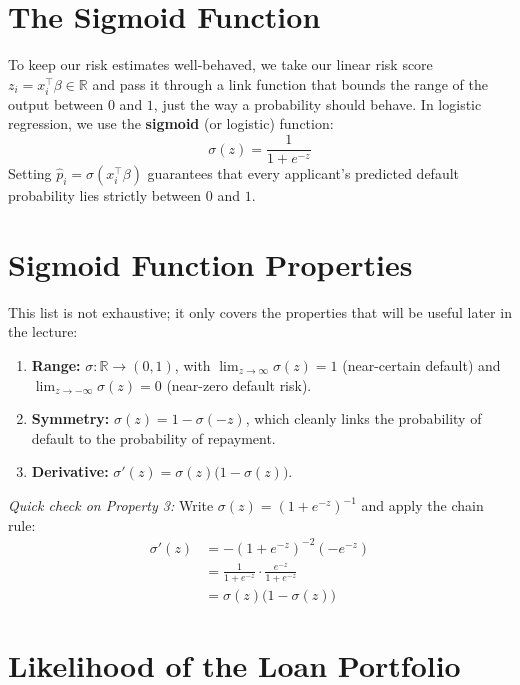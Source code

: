 \documentclass[12pt]{article}
\begin{document}
\section{The Sigmoid Function}

To keep our risk estimates well-behaved, we take our linear risk score
$z_i = x_i^\top \beta \in \mathbb{R}$ and pass it through a link function
that bounds the range of the output between $0$ and $1$, just the way a
probability should behave. In logistic regression, we use the \textbf{sigmoid}
(or logistic) function:
\begin{equation}
    \sigma(z) = \frac{1}{1 + e^{-z}}
\end{equation}
Setting $\hat{p}_i = \sigma(x_i^\top \beta)$ guarantees that every applicant's
predicted default probability lies strictly between $0$ and $1$.

\section{Sigmoid Function Properties}

This list is not exhaustive; it only covers the properties that will be useful
later in the lecture:
\begin{enumerate}
    \item \textbf{Range:} $\sigma: \mathbb{R} \to (0, 1)$, with
    $\lim_{z \to \infty} \sigma(z) = 1$ (near-certain default) and
    $\lim_{z \to -\infty} \sigma(z) = 0$ (near-zero default risk).
    \item \textbf{Symmetry:} $\sigma(z) = 1 - \sigma(-z)$, which cleanly links
    the probability of default to the probability of repayment.
    \item \textbf{Derivative:} $\sigma'(z) = \sigma(z)\bigl(1 - \sigma(z)\bigr)$.
\end{enumerate}

\textit{Quick check on Property 3:} Write $\sigma(z) = (1 + e^{-z})^{-1}$ and
apply the chain rule:
\begin{align}
    \sigma'(z) &= -(1 + e^{-z})^{-2}(-e^{-z}) \nonumber \\
               &= \frac{1}{1 + e^{-z}} \cdot \frac{e^{-z}}{1 + e^{-z}} \nonumber \\
               &= \sigma(z)\bigl(1 - \sigma(z)\bigr)
\end{align}

\section{Likelihood of the Loan Portfolio}
\end{document}
